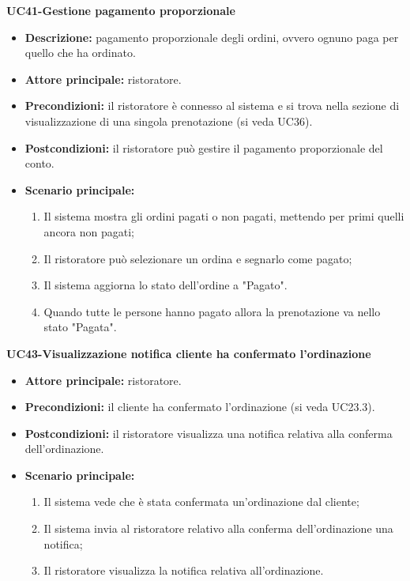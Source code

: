 \textbf{UC41-Gestione pagamento proporzionale}  
\begin{itemize}
    \item \textbf{Descrizione:} pagamento proporzionale degli ordini, ovvero ognuno paga per quello che ha ordinato.
    \item \textbf{Attore principale:} ristoratore.
    \item \textbf{Precondizioni:} il ristoratore è connesso al sistema e si trova nella sezione di visualizzazione di una singola prenotazione (si veda UC36).
    \item \textbf{Postcondizioni:} il ristoratore può gestire il pagamento proporzionale del conto.
    \item \textbf{Scenario principale:}
    \begin{enumerate}
        \item Il sistema mostra gli ordini pagati o non pagati, mettendo per primi quelli ancora non pagati;
        \item Il ristoratore può selezionare un ordina e segnarlo come pagato;
        \item Il sistema aggiorna lo stato dell'ordine a "Pagato".
        \item Quando tutte le persone hanno pagato allora la prenotazione va nello stato "Pagata".

    \end{enumerate}
\end{itemize}

\textbf{UC43-Visualizzazione notifica cliente ha confermato l'ordinazione}
\begin{itemize}
\item \textbf{Attore principale:} ristoratore.
\item \textbf{Precondizioni:} il cliente ha confermato l'ordinazione (si veda UC23.3).
\item \textbf{Postcondizioni:} il ristoratore visualizza una notifica relativa alla conferma dell'ordinazione.
\item \textbf{Scenario principale:}
\begin{enumerate}
    \item Il sistema vede che è stata confermata un'ordinazione dal cliente;
    \item Il sistema invia al ristoratore relativo alla conferma dell'ordinazione una notifica;
    \item Il ristoratore visualizza la notifica relativa all'ordinazione.
\end{enumerate}
\end{itemize}

